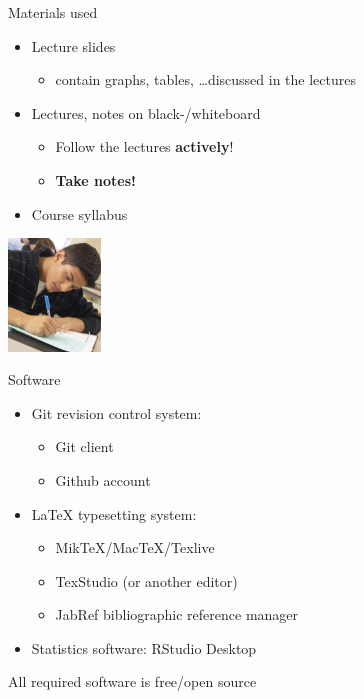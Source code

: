 \documentclass{beamer}
\begin{document}
\begin{frame}{Materials used}

  \begin{itemize}
    \item Lecture slides
      \begin{itemize}
        \item contain graphs, tables, \ldots discussed in the lectures
      \end{itemize}
    \item Lectures, notes on black-/whiteboard
      \begin{itemize}
        \item Follow the lectures \textbf{actively}!
        \item \textbf{Take notes!}
      \end{itemize}
    \item Course syllabus
  \end{itemize}


  \begin{center}
    \includegraphics[height=3cm]{img/intro-06.jpg}
  \end{center}

\end{frame}

\begin{frame}{Software}
    
    \begin{itemize}
        \item Git revision control system:
        \begin{itemize}
            \item Git client
            \item Github account
        \end{itemize}
        \item {\LaTeX} typesetting system:
        \begin{itemize}
            \item MikTeX/MacTeX/Texlive
            \item TexStudio (or another editor)
            \item JabRef bibliographic reference manager
        \end{itemize}
        \item Statistics software: RStudio Desktop
    \end{itemize}

    \centering
    All required software is free/open source
\end{frame}
\end{document}
